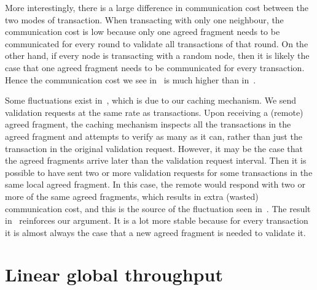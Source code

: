 More interestingly, there is a large difference in communication cost between the two modes of transaction.
When transacting with only one neighbour, the communication cost is low because only one agreed fragment needs to be communicated for every round to validate all transactions of that round.
On the other hand,
if every node is transacting with a random node, then it is likely the case that one agreed fragment needs to be communicated for every transaction.
Hence the communication cost we see in~ is much higher than in~.

Some fluctuations exist in~, which is due to our caching mechanism.
We send validation requests at the same rate as transactions.
Upon receiving a (remote) agreed fragment, the caching mechanism inspects all the transactions in the agreed fragment and attempts to verify as many as it can,
rather than just the transaction in the original validation request.
However, it may be the case that the agreed fragments arrive later than the validation request interval.
Then it is possible to have sent two or more validation requests for some transactions in the same local agreed fragment.
In this case, the remote would respond with two or more of the same agreed fragments,
which results in extra (wasted) communication cost, and this is the source of the fluctuation seen in~.
The result in~ reinforces our argument.
It is a lot more stable because for every transaction it is almost always the case that a new agreed fragment is needed to validate it.

\section{Linear global throughput}

